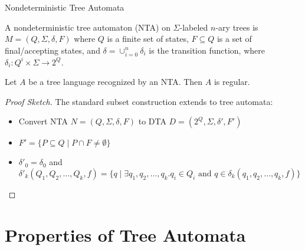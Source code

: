 \documentclass[10pt,svgnames,fragile]{beamer}
\begin{document}
\begin{frame}{Nondeterministic Tree Automata}
  \begin{definition}
    A nondeterministic tree automaton (NTA) on $\Sigma$-labeled $n$-ary trees is $M = (Q, \Sigma, \delta, F)$ where $Q$ is a finite set of states, $F \subseteq Q$ is a set of final/accepting states, and $\delta = \cup_{i=0}^{n} \delta_i$ is the transition function, where $\delta_i: Q^i \times \Sigma \to 2^Q$.
  \end{definition}
  
  \pause
  
  \begin{theorem}
    Let $A$ be a tree language recognized by an NTA. Then $A$ is regular.
  \end{theorem}
  \pause
  \begin{proof}[Proof Sketch]
    The standard subset construction extends to tree automata:
    \begin{itemize}
      \item Convert NTA $N = (Q, \Sigma, \delta, F)$ to DTA $D = (2^Q, \Sigma, \delta', F')$
      \item $F' = \{P \subseteq Q \mid P \cap F \neq \emptyset\}$
      \item $\delta'_0 = \delta_0$ and $\delta'_k(Q_1, Q_2, \ldots, Q_k, f) = \{q \mid \exists q_1, q_2, \ldots, q_k. q_i \in Q_i \text{ and } q \in \delta_k(q_1, q_2, \ldots, q_k, f)\}$
    \end{itemize}
  \end{proof}
\end{frame}

\section{Properties of Tree Automata}
\end{document}
